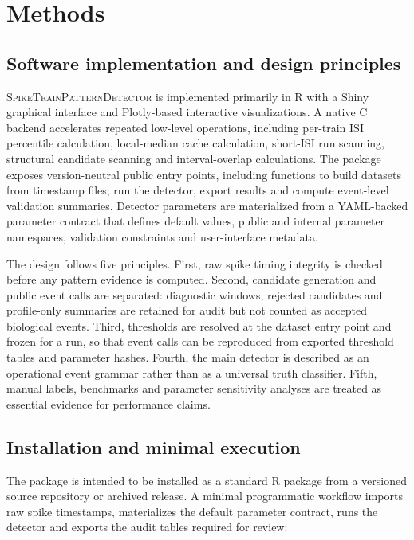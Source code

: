\documentclass[pdflatex,sn-apa]{sn-jnl}
\newcommand{\stpd}{\textsc{SpikeTrainPatternDetector}}
\begin{document}
\section{Methods}

\subsection{Software implementation and design principles}

\stpd{} is implemented primarily in R with a Shiny graphical interface and Plotly-based interactive visualizations. A native C backend accelerates repeated low-level operations, including per-train ISI percentile calculation, local-median cache calculation, short-ISI run scanning, structural candidate scanning and interval-overlap calculations. The package exposes version-neutral public entry points, including functions to build datasets from timestamp files, run the detector, export results and compute event-level validation summaries. Detector parameters are materialized from a YAML-backed parameter contract that defines default values, public and internal parameter namespaces, validation constraints and user-interface metadata.

The design follows five principles. First, raw spike timing integrity is checked before any pattern evidence is computed. Second, candidate generation and public event calls are separated: diagnostic windows, rejected candidates and profile-only summaries are retained for audit but not counted as accepted biological events. Third, thresholds are resolved at the dataset entry point and frozen for a run, so that event calls can be reproduced from exported threshold tables and parameter hashes. Fourth, the main detector is described as an operational event grammar rather than as a universal truth classifier. Fifth, manual labels, benchmarks and parameter sensitivity analyses are treated as essential evidence for performance claims.

\subsection{Installation and minimal execution}

The package is intended to be installed as a standard R package from a versioned source repository or archived release. A minimal programmatic workflow imports raw spike timestamps, materializes the default parameter contract, runs the detector and exports the audit tables required for review:
\end{document}
